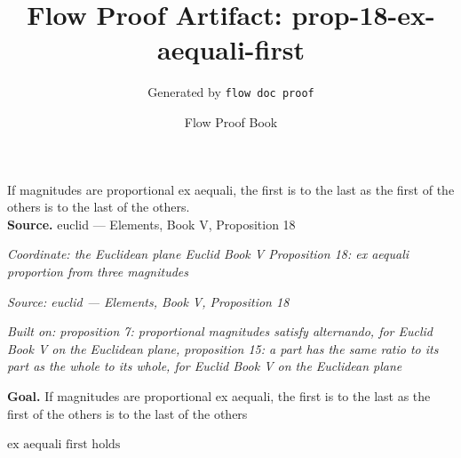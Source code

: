 \documentclass[11pt]{article}
\title{Flow Proof Artifact: prop-18-ex-aequali-first}
\author{Generated by \texttt{flow doc proof}}
\date{Flow Proof Book}
\theoremstyle{definition}
\begin{document}
\maketitle
If magnitudes are proportional ex aequali, the first is to the last as the first of the others is to the last of the others.\\[0.5em]
\textbf{Source.} euclid — Elements, Book V, Proposition 18\\[0.5em]
\bigskip
{}\par
\smallskip\noindent\textit{Coordinate: the Euclidean plane \cdot Euclid Book V \cdot Proposition 18: ex aequali proportion from three magnitudes}\par
\smallskip\noindent\textit{Source: euclid — Elements, Book V, Proposition 18}\par
\smallskip\noindent\textit{Built on: proposition 7: proportional magnitudes satisfy alternando, for Euclid Book V on the Euclidean plane, proposition 15: a part has the same ratio to its part as the whole to its whole, for Euclid Book V on the Euclidean plane}\par
\medskip
\noindent\textbf{Goal.} If magnitudes are proportional ex aequali, the first is to the last as the first of the others is to the last of the others\par
\noindent$\displaystyle \text{ex aequali first holds}$\par
\medskip
\noindent
\end{document}
